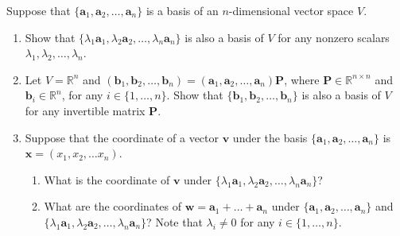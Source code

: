 \documentclass[11pt,letter,notitlepage]{article}
\begin{document}
\newpage

\begin{exercise}

    Suppose that $\{\mathbf{a}_1, \mathbf{a}_2,\dots,\mathbf{a}_n\}$ is a basis of an $n$-dimensional vector space $V$. 
    \begin{enumerate}
        \item Show that $\{\lambda_1 \mathbf{a}_1, \lambda_2 \mathbf{a}_2, \dots, \lambda_n\mathbf{a}_n\}$ is also a basis of $V$ for any nonzero scalars $\lambda_1,\lambda_2, \dots, \lambda_n$. 
        \item Let $V =\mathbb{R}^n$ and  $(\mathbf{b}_1,\mathbf{b}_2,\dots, \mathbf{b}_n) = (\mathbf{a}_1,\mathbf{a}_2, \dots, \mathbf{a}_n)\mathbf{P}$, where $\mathbf{P}\in \mathbb{R}^{n\times n}$ and $\mathbf{b}_i\in \mathbb{R}^n$, for any $i\in\{1,\dots,n\}$. Show that $\{ \mathbf{b}_1, \mathbf{b}_2, \dots, \mathbf{b}_n\}$ is also a basis of $V$ for any invertible  matrix $\mathbf{P}$.
        \item Suppose that the coordinate of a vector $\mathbf{v}$ under the basis $\{\mathbf{a}_1,  \mathbf{a}_2,\dots,\mathbf{a}_n\}$ is $\mathbf{x}=(x_1,x_2,\dots x_n)$.
        \begin{enumerate}
            \item What is the coordinate of $\mathbf{v}$ under $\{\lambda_1 \mathbf{a}_1, \lambda_2 \mathbf{a}_2, \dots, \lambda_n\mathbf{a}_n\}$? 
            
            \item What are the coordinates of $\mathbf{w} = \mathbf{a}_1+\dots + \mathbf{a}_n$ under $\{\mathbf{a}_1, \mathbf{a}_2,\dots,\mathbf{a}_n\}$ and $\{\lambda_1 \mathbf{a}_1, \lambda_2 \mathbf{a}_2, \dots, \lambda_n\mathbf{a}_n\}$? Note that  $\lambda_i \neq 0$ for any $i\in \{1,\dots,n\}$.
        \end{enumerate}
    \end{enumerate}
\end{exercise}
\end{document}
